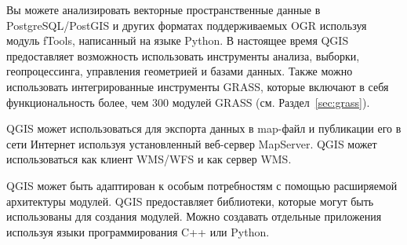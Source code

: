 
Вы можете анализировать векторные пространственные данные в PostgreSQL/PostGIS
и других форматах поддерживаемых OGR используя модуль fTools, написанный на
языке Python. В настоящее время QGIS предоставляет возможность
использовать инструменты анализа, выборки, геопроцессинга, управления
геометрией и базами данных. Также можно использовать интегрированные
инструменты GRASS, которые включают в себя функциональность более, чем
300 модулей GRASS (см. Раздел~\ref{sec:grass}).


QGIS может использоваться для экспорта данных в map-файл и публикации
его в сети Интернет используя установленный веб-сервер MapServer.
QGIS может использоваться как клиент WMS/WFS и как сервер WMS.


QGIS может быть адаптирован к особым потребностям с помощью расширяемой
архитектуры модулей. QGIS предоставляет библиотеки, которые могут быть
использованы для создания модулей. Можно создавать отдельные приложения
используя языки программирования C++ или Python.


